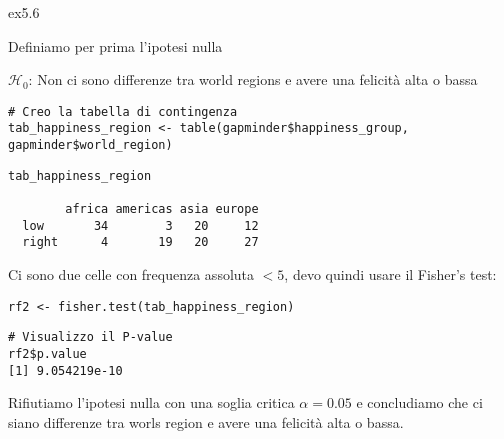 \begin{solution}{ex5.6}
	
\noindent Definiamo per prima l'ipotesi nulla

\noindent $\mathcal{H}_0$: Non ci sono differenze tra world regions e avere una felicit\`a alta o bassa

\begin{lstlisting}[style=Rstylescript]
# Creo la tabella di contingenza	
tab_happiness_region <- table(gapminder$happiness_group, gapminder$world_region)
\end{lstlisting}


\begin{lstlisting}[style=Rstyle]
tab_happiness_region
       
        africa americas asia europe
  low       34        3   20     12
  right      4       19   20     27
\end{lstlisting}

\noindent Ci sono due celle con frequenza assoluta $< 5$, devo quindi usare il Fisher's test:


\begin{lstlisting}[style=Rstylescript]
rf2 <- fisher.test(tab_happiness_region)
\end{lstlisting}

\begin{lstlisting}[style=Rstyle]
# Visualizzo il P-value
rf2$p.value
[1] 9.054219e-10
\end{lstlisting}
%
Rifiutiamo l'ipotesi nulla con una soglia critica $\alpha = 0.05$ e concludiamo che ci siano differenze tra worls region e avere una felicit\`a alta o bassa.
	
\end{solution}	